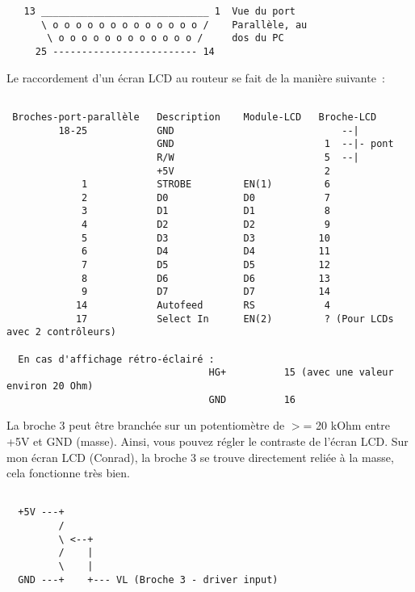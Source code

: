 \begin{example}
\begin{verbatim}
   13 _____________________________ 1  Vue du port
      \ o o o o o o o o o o o o o /    Parallèle, au 
       \ o o o o o o o o o o o o /     dos du PC
     25 ------------------------- 14  

\end{verbatim}
\end{example}


 Le raccordement d'un écran LCD au routeur se fait de la manière suivante~:


\begin{example}
\begin{verbatim}

 Broches-port-parallèle   Description    Module-LCD   Broche-LCD
         18-25            GND                             --|
                          GND                          1  --|- pont
                          R/W                          5  --|
                          +5V                          2
             1            STROBE         EN(1)         6
             2            D0             D0            7
             3            D1             D1            8
             4            D2             D2            9
             5            D3             D3           10
             6            D4             D4           11
             7            D5             D5           12
             8            D6             D6           13
             9            D7             D7           14
            14            Autofeed       RS            4
            17            Select In      EN(2)         ? (Pour LCDs avec 2 contrôleurs)

  En cas d'affichage rétro-éclairé :
                                   HG+          15 (avec une valeur environ 20 Ohm)
                                   GND          16
\end{verbatim}
\end{example}

  La broche 3 peut être branchée sur un potentiomètre de $>$= 20 kOhm entre +5V
  et GND (masse). Ainsi, vous pouvez régler le contraste de l'écran LCD. Sur
  mon écran LCD (Conrad), la broche 3 se trouve directement reliée à la masse,
  cela fonctionne très bien.

\begin{example}
\begin{verbatim}

  +5V ---+
         /
         \ <--+
         /    |
         \    |
  GND ---+    +--- VL (Broche 3 - driver input)
\end{verbatim}
\end{example}



